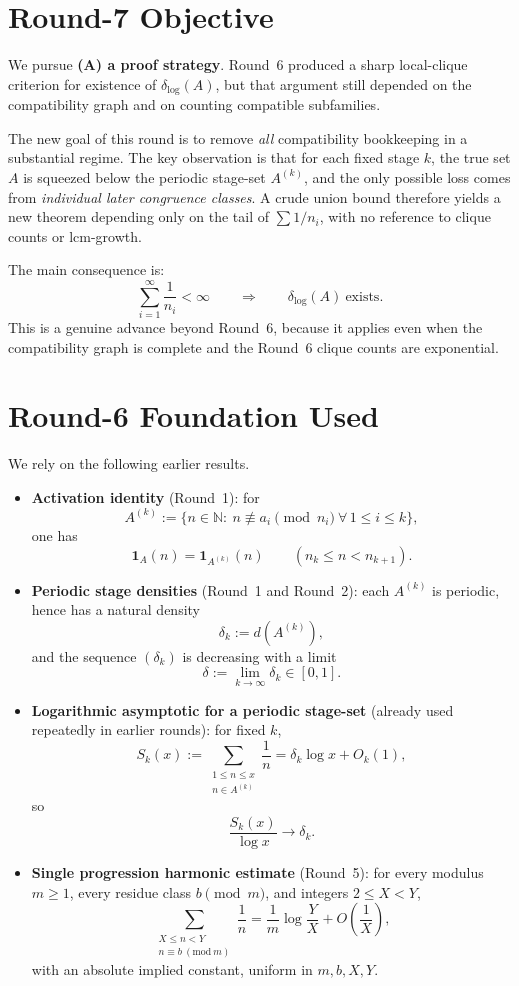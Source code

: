\section{Round-7 Objective}
We pursue \textbf{(A) a proof strategy}.  Round~6 produced a sharp local-clique criterion for existence of
\(\delta_{\log}(A)\), but that argument still depended on the compatibility graph and on counting compatible
subfamilies.

The new goal of this round is to remove \emph{all} compatibility bookkeeping in a substantial regime.
The key observation is that for each fixed stage \(k\), the true set \(A\) is squeezed below the periodic stage-set
\(A^{(k)}\), and the only possible loss comes from \emph{individual later congruence classes}.
A crude union bound therefore yields a new theorem depending only on the tail of
\(\sum 1/n_i\), with no reference to clique counts or lcm-growth.

The main consequence is:
\begin{equation}
\sum_{i=1}^{\infty}\frac{1}{n_i}<\infty
\qquad\Longrightarrow\qquad
\delta_{\log}(A)\ \text{exists}.
\tag{7.1}
\end{equation}
This is a genuine advance beyond Round~6, because it applies even when the compatibility graph is complete and the
Round~6 clique counts are exponential.

\section{Round-6 Foundation Used}
We rely on the following earlier results.
\begin{itemize}
\item \textbf{Activation identity} (Round~1): for
\[
A^{(k)}:=\{n\in\mathbb N:\ n\not\equiv a_i\pmod{n_i}\ \forall\,1\le i\le k\},
\]
one has
\[
\mathbf 1_A(n)=\mathbf 1_{A^{(k)}}(n)\qquad (n_k\le n<n_{k+1}).
\]
\item \textbf{Periodic stage densities} (Round~1 and Round~2): each \(A^{(k)}\) is periodic, hence has a natural density
\[
\delta_k:=d(A^{(k)}),
\]
and the sequence \((\delta_k)\) is decreasing with a limit
\[
\delta:=\lim_{k\to\infty}\delta_k\in[0,1].
\]
\item \textbf{Logarithmic asymptotic for a periodic stage-set} (already used repeatedly in earlier rounds):
for fixed \(k\),
\[
S_k(x):=\sum_{\substack{1\le n\le x\\ n\in A^{(k)}}}\frac1n
=\delta_k\log x+O_k(1),
\]
so
\[
\frac{S_k(x)}{\log x}\to \delta_k.
\]
\item \textbf{Single progression harmonic estimate} (Round~5): for every modulus \(m\ge 1\), every residue class
\(b\pmod m\), and integers \(2\le X<Y\),
\[
\sum_{\substack{X\le n<Y\\ n\equiv b\ (\mathrm{mod}\ m)}}\frac1n
=
\frac1m\log\frac{Y}{X}+O\!\left(\frac1X\right),
\]
with an absolute implied constant, uniform in \(m,b,X,Y\).
\end{itemize}

